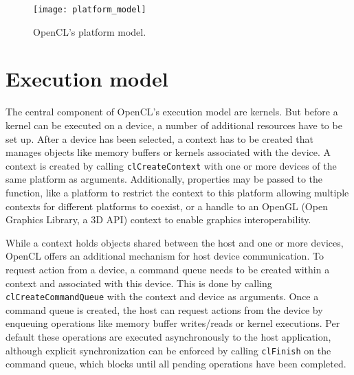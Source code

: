 \begin{figure}[h]
\centering
\texttt{[image: platform\_model]}
\caption{OpenCL's platform model.}
\label{fig:platform_model}
\end{figure}

\section{Execution model}
\label{sec:execution_model}
The central component of OpenCL's execution model are kernels. But before a kernel can be executed on a device, a number of additional resources have to be set up.
After a device has been selected, a context has to be created that manages objects like memory buffers or kernels associated with the device. A context is created by calling \lstinline!clCreateContext! with one or more devices of the same platform as arguments. Additionally, properties may be passed to the function, like a platform to restrict the context to this platform allowing multiple contexts for different platforms to coexist, or a handle to an OpenGL (Open Graphics Library, a 3D API) context to enable graphics interoperability. \cite[p.22]{opencl_book}

While a context holds objects shared between the host and one or more devices, OpenCL offers an additional mechanism for host device communication. To request action from a device, a command queue needs to be created within a context and associated with this device. This is done by calling \lstinline!clCreateCommandQueue! with the context and device as arguments. Once a command queue is created, the host can request actions from the device by enqueuing operations like memory buffer writes/reads or kernel executions. Per default these operations are executed asynchronously to the host application, although explicit synchronization can be enforced by calling \lstinline!clFinish! on the command queue, which blocks until all pending operations have been completed. \cite[p.22, 23,26]{opencl_book}

